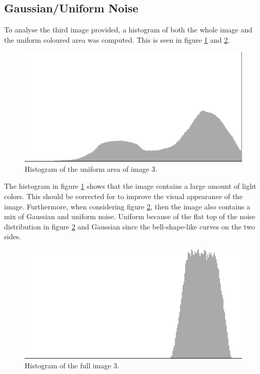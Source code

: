 

\subsection{Gaussian/Uniform Noise}
To analyse the third image provided, a histogram of both the whole image and the uniform coloured area was computed.
This is seen in figure \ref{fig:hist_pre_im03} and \ref{fig:hist_uni_im03}.


\begin{figure}[H]
\centering
\includegraphics[width= 0.9 \linewidth]{../code/images/histogram_full_pre_03}
\caption{Histogram of the uniform area of image 3.}
\label{fig:hist_pre_im03}
\end{figure}

The histogram in figure \ref{fig:hist_pre_im03} shows that the image contains a large amount of light colors.
This should be corrected for to improve the visual appearance of the image.
Furthermore, when considering figure \ref{fig:hist_uni_im03}, then the image also contains a mix of Gaussian and uniform noise.
Uniform because of the flat top of the noise distribution in figure \ref{fig:hist_uni_im03} and Gaussian since the bell-shape-like curves on the two sides.


\begin{figure}[H]
\centering
\includegraphics[width= 0.9 \linewidth]{../code/images/histogram_uniform_03}
\caption{Histogram of the full image 3.}
\label{fig:hist_uni_im03}
\end{figure}


